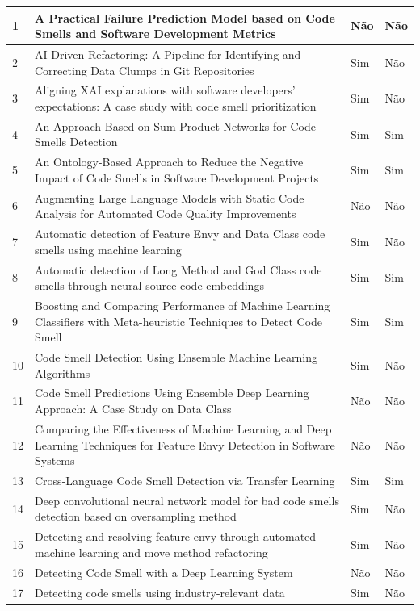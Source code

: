 {\begin{longtable}{|p{0.8cm}|p{8cm}|p{3cm}|p{3cm}|}
    1  & A Practical Failure Prediction Model based on Code Smells and Software Development Metrics & Não & Não \\ \hline
    2  & AI-Driven Refactoring: A Pipeline for Identifying and Correcting Data Clumps in Git Repositories & Sim & Não \\ \hline
    3  & Aligning XAI explanations with software developers’ expectations: A case study with code smell prioritization & Sim & Não \\ \hline
    4  & An Approach Based on Sum Product Networks for Code Smells Detection & Sim & Sim \\ \hline
    5  & An Ontology-Based Approach to Reduce the Negative Impact of Code Smells in Software Development Projects & Sim & Sim \\ \hline
    6  & Augmenting Large Language Models with Static Code Analysis for Automated Code Quality Improvements & Não & Não \\ \hline
    7  & Automatic detection of Feature Envy and Data Class code smells using machine learning & Sim & Não \\ \hline
    8  & Automatic detection of Long Method and God Class code smells through neural source code embeddings & Sim & Sim \\ \hline
    9  & Boosting and Comparing Performance of Machine Learning Classifiers with Meta-heuristic Techniques to Detect Code Smell & Sim & Sim \\ \hline
    10 & Code Smell Detection Using Ensemble Machine Learning Algorithms & Sim & Não \\ \hline
    11 & Code Smell Predictions Using Ensemble Deep Learning Approach: A Case Study on Data Class & Não & Não \\ \hline
    12 & Comparing the Effectiveness of Machine Learning and Deep Learning Techniques for Feature Envy Detection in Software Systems & Não & Não \\ \hline
    13 & Cross-Language Code Smell Detection via Transfer Learning & Sim & Sim \\ \hline
    14 & Deep convolutional neural network model for bad code smells detection based on oversampling method & Sim & Não \\ \hline
    15 & Detecting and resolving feature envy through automated machine learning and move method refactoring & Sim & Não \\ \hline
    16 & Detecting Code Smell with a Deep Learning System & Não & Não \\ \hline
    17 & Detecting code smells using industry-relevant data & Sim & Não \\ \hline

\end{longtable}}
